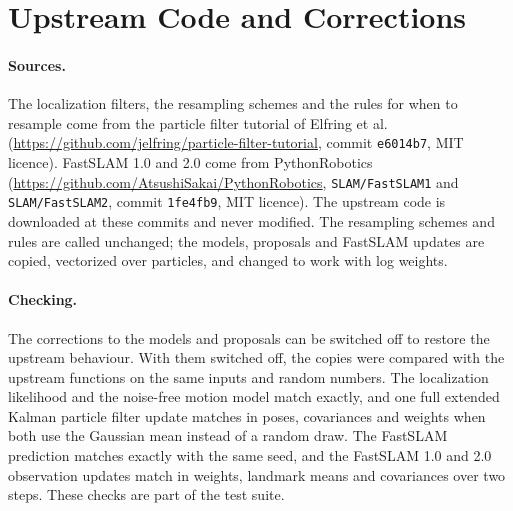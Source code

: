 \section{Upstream Code and Corrections}\label{app:upstream}

\paragraph{Sources.} The localization filters, the resampling schemes and the rules for when to resample come from the
particle filter tutorial of Elfring et al.\ \cite{elfring2021particle} (\url{https://github.com/jelfring/particle-filter-tutorial},
commit \texttt{e6014b7}, MIT licence). FastSLAM 1.0 and 2.0 come from PythonRobotics \cite{sakai2018pythonrobotics} (\url{https://github.com/AtsushiSakai/PythonRobotics},
\texttt{SLAM/FastSLAM1} and \texttt{SLAM/FastSLAM2}, commit \texttt{1fe4fb9}, MIT licence). The upstream code is
downloaded at these commits and never modified. The resampling schemes and rules are called unchanged; the models,
proposals and FastSLAM updates are copied, vectorized over particles, and changed to work with log weights.

\paragraph{Checking.} The corrections to the models and proposals can be switched off to restore the upstream behaviour.
With them switched off, the copies were compared with the upstream functions on the same inputs and random numbers. The localization likelihood and the noise-free
motion model match exactly, and one full extended Kalman particle filter update matches in poses, covariances and weights
when both use the Gaussian mean instead of a random draw. The FastSLAM prediction matches exactly with the same seed, and
the FastSLAM 1.0 and 2.0 observation updates match in weights, landmark means and covariances over two steps. These checks
are part of the test suite.

